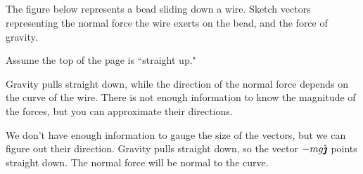 
\subsection*{\Conceptual}

\begin{question}
	The figure below represents a bead sliding down a wire. Sketch  vectors representing the normal force the wire exerts on the bead, and the force of gravity.
\begin{center}
	\end{center}
	Assume the top of the page is ``straight up."
\end{question}
\begin{hint}
Gravity pulls straight down, while the direction of the normal force depends on the curve of the wire. There is not enough information to know the magnitude of the forces, but you can approximate their directions.
\end{hint}
\begin{answer}
	\begin{center}
	\end{center}

\end{answer}
\begin{solution}
	We don't have enough information to gauge the size of the vectors, but we can figure out their direction. Gravity pulls straight down, so the vector $-mg\hat{\pmb{\jmath}}$ points straight down. The normal force will be normal to the curve.
	\begin{center}
	\end{center}
	
\end{solution}
